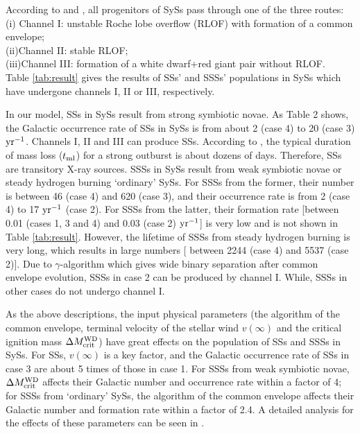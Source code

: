 \documentclass{elsart}
\begin{document}
 According to \cite{yun95} and \cite{lu06}, all progenitors of
SySs
pass through one of the three routes:\\
(i) Channel I: unstable Roche lobe overflow (RLOF) with formation of
a common
envelope;\\
(ii)Channel II: stable RLOF;\\
(iii)Channel III: formation of a white dwarf+red giant pair without RLOF. \\
Table \ref{tab:result} gives the results of SSs' and SSSs'
populations in SySs which have undergone channels I, II or III,
respectively.

In our model, SSs in SySs result from strong symbiotic novae. As
Table 2 shows, the Galactic occurrence rate of SSs in SySs is from
about 2 (case 4) to 20 (case 3) $\rm yr^{-1}$. Channels I, II and
III can produce SSs. According to \cite{yar05}, the typical duration
of mass loss ($t_{\rm ml}$) for a strong outburst is about dozens of
days. Therefore, SSs are transitory X-ray sources. SSSs in SySs
result from weak symbiotic novae or steady hydrogen burning
`ordinary' SySs. For SSSs from the former, their number is between
46 (case 4) and 620 (case 3), and their occurrence rate is from 2
(case 4) to 17 $\rm yr^{-1}$ (case 2). For SSSs from the latter,
their formation rate [between 0.01 (cases 1, 3 and 4) and 0.03 (case
2) $\rm yr^{-1}$] is very low and is not shown in Table
\ref{tab:result}. However, the lifetime of SSSs from steady hydrogen
burning is very long, which results in large numbers [ between 2244
(case 4) and 5537 (case 2)]. Due to $\gamma$-algorithm which gives
wide binary separation after common envelope evolution, SSSs in case
2 can be produced by channel I. While, SSSs in other cases do not
undergo channel I.

As the above descriptions, the input physical parameters (the
algorithm of the common envelope, terminal velocity of the stellar
wind $v(\infty)$ and the critical ignition mass $\Delta M_{\rm
crit}^{\rm WD}$) have great effects on the population of SSs and
SSSs in SySs. For SSs, $v(\infty)$ is a key factor, and the Galactic
occurrence rate of SSs in case 3 are about 5 times of those in case
1. For SSSs from weak symbiotic novae, $\Delta M_{\rm crit}^{\rm
WD}$ affects their Galactic number and occurrence rate within a
factor of 4; for SSSs from `ordinary' SySs, the algorithm of the
common envelope affects their Galactic number and formation rate
within a factor of 2.4. A detailed analysis for the effects of these
parameters can be seen in \cite{lu06}.
\end{document}
